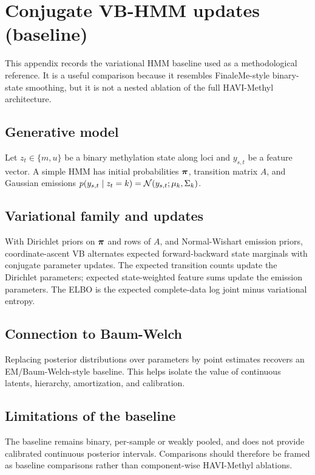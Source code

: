 \section{Conjugate VB-HMM updates (baseline)}
\label{app:vbhmm}

This appendix records the variational HMM baseline used as a methodological reference. It is a useful comparison because it resembles FinaleMe-style binary-state smoothing, but it is not a nested ablation of the full HAVI-Methyl architecture.

\subsection*{Generative model}
Let $z_t\in\{m,u\}$ be a binary methylation state along loci and $y_{s,t}$ be a feature vector. A simple HMM has initial probabilities $\boldsymbol{\pi}$, transition matrix $A$, and Gaussian emissions $p(y_{s,t}\mid z_t=k)=\mathcal{N}(y_{s,t};\mu_k,\Sigma_k)$.

\subsection*{Variational family and updates}
With Dirichlet priors on $\boldsymbol{\pi}$ and rows of $A$, and Normal-Wishart emission priors, coordinate-ascent VB alternates expected forward-backward state marginals with conjugate parameter updates. The expected transition counts update the Dirichlet parameters; expected state-weighted feature sums update the emission parameters. The ELBO is the expected complete-data log joint minus variational entropy.

\subsection*{Connection to Baum-Welch}
Replacing posterior distributions over parameters by point estimates recovers an EM/Baum-Welch-style baseline. This helps isolate the value of continuous latents, hierarchy, amortization, and calibration.

\subsection*{Limitations of the baseline}
The baseline remains binary, per-sample or weakly pooled, and does not provide calibrated continuous posterior intervals. Comparisons should therefore be framed as baseline comparisons rather than component-wise HAVI-Methyl ablations.

